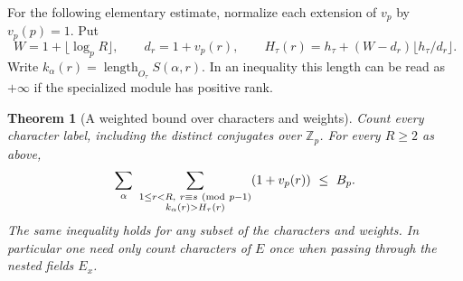 \documentclass[a4paper,11pt]{article}
\newtheorem{theorem}[proposition]{Theorem}
\theoremstyle{definition}
\theoremstyle{remark}
\newcommand{\ZZ}{\mathbb Z}\newcommand{\ord}{\operatorname{ord}}
\numberwithin{equation}{section}
\begin{document}
For the following elementary estimate, normalize each extension
of \(v_p\) by \(v_p(p)=1\). Put
\[
 W=1+\lfloor\log_p R\rfloor,\qquad
 d_r=1+v_p(r),\qquad
 H_\tau(r)=h_\tau+(W-d_r)\lfloor h_\tau/d_r\rfloor .
\]
Write \(k_\alpha(r)=\operatorname{length}_{O_\tau}S(\alpha,r)\).
In an inequality this length can be read as \(+\infty\) if
the specialized module has positive rank.

\begin{theorem}[A weighted bound over characters and weights]
\leavevmode\label{thm:allhalfweights644}
Count every character label, including the distinct conjugates
over \(\ZZ_p\). For every \(R\ge2\) as above,
\[
 \sum_{\alpha}\ 
 \sum_{\substack{1\le r<R,\ r\equiv s\ ({\rm mod}\ p-1)\\
                   k_\alpha(r)>H_\tau(r)}}
                   (1+v_p(r))\ \le\ B_p .
\]
The same inequality holds for any subset of the characters and
weights. In particular one need only count characters of \(E\)
once when passing through the nested fields \(E_x\).
\end{theorem}
\end{document}
